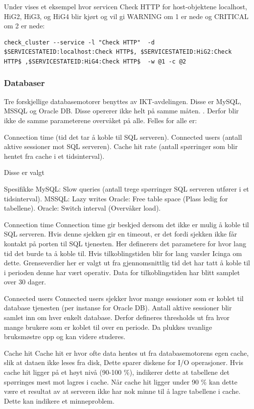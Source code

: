 Under vises et eksempel hvor servicen Check HTTP for host-objektene localhost, HiG2, HiG3, og HiG4 blir kjørt og vil gi WARNING om 1 er nede og CRITICAL om 2 er nede: 
\begin{lstlisting}
check_cluster --service -l "Check HTTP"  -d $SERVICESTATEID:localhost:Check HTTP$, $SERVICESTATEID:HiG2:Check HTTP$ ,$SERVICESTATEID:HiG4:Check HTTP$  -w @1 -c @2
\end{lstlisting}

\subsubsection{Databaser}
Tre forskjellige databasemotorer benyttes av IKT-avdelingen. Disse er MySQL, MSSQL og Oracle DB. Disse opererer ikke helt på samme måten. \cite{databasecomparison}. Derfor blir ikke de samme parameterene overvåket på alle. Felles for alle er:

Connection time (tid det tar å koble til SQL serveren).
Connected users (antall aktive sessioner mot SQL serveren).
Cache hit rate (antall spørringer som blir hentet fra cache i et tidsinterval).

Disse er valgt

Spesifikke
MySQL: Slow queries (antall trege spørringer SQL serveren utfører i et tidsinterval).
MSSQL: Lazy writes
Oracle: Free table space (Plass ledig for tabellene).
Oracle: Switch interval (Overvåker load).


Connection time
Connection time gir beskjed dersom det ikke er mulig å koble til SQL serveren. Hvis denne sjekken gir en timeout, er det fordi sjekken ikke får kontakt på porten til SQL tjenesten. Her definerers det parametere for hvor lang tid det burde ta å koble til. Hvis tilkoblingstiden blir for lang varsler Icinga om dette. Grenseverdier her er valgt ut fra gjennomsnittlig tid det har tatt å koble til i perioden denne har vært operativ. Data for tilkoblingstiden har blitt samplet over 30 dager.

Connected users
Connected users sjekker hvor mange sessioner som er koblet til database tjenesten (per instanse for Oracle DB). Antall aktive sessioner blir samlet inn om hver enkelt database. Derfor defineres thresholds ut fra hvor mange brukere som er koblet til over en periode. Da plukkes uvanlige bruksmøstre opp og kan videre studeres.

Cache hit
Cache hit er hvor ofte data hentes ut fra databasemotorens egen cache, slik at dataen ikke leses fra disk, Dette sparer diskene for I/O operasjoner. Hvis cache hit ligger på et høyt nivå (90-100 \%), indikerer dette at tabellene det spørringes mest mot lagres i cache. Når cache hit ligger under 90 \% kan dette være et resultat av at serveren ikke har nok minne til å lagre tabellene i cache. Dette kan indikere et minneproblem.

